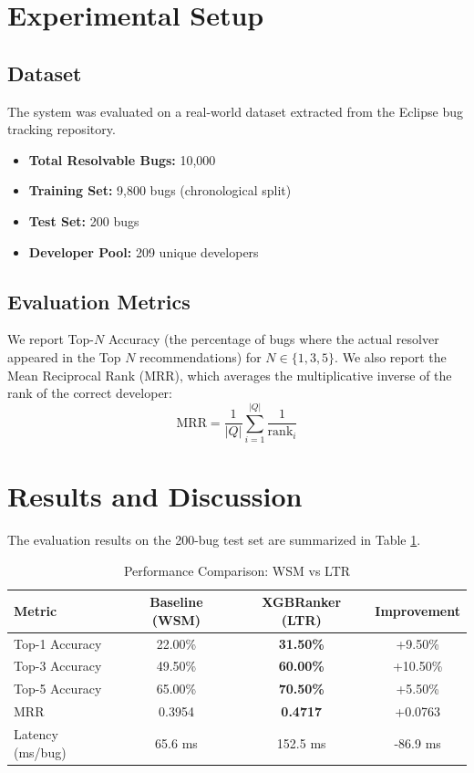 \documentclass[conference]{IEEEtran}
\begin{document}
\section{Experimental Setup}

\subsection{Dataset}
The system was evaluated on a real-world dataset extracted from the Eclipse bug tracking repository. 
\begin{itemize}
    \item \textbf{Total Resolvable Bugs:} 10,000
    \item \textbf{Training Set:} 9,800 bugs (chronological split)
    \item \textbf{Test Set:} 200 bugs
    \item \textbf{Developer Pool:} 209 unique developers
\end{itemize}

\subsection{Evaluation Metrics}
We report Top-$N$ Accuracy (the percentage of bugs where the actual resolver appeared in the Top $N$ recommendations) for $N \in \{1, 3, 5\}$. We also report the Mean Reciprocal Rank (MRR), which averages the multiplicative inverse of the rank of the correct developer:
\begin{equation}
\text{MRR} = \frac{1}{|Q|} \sum_{i=1}^{|Q|} \frac{1}{\text{rank}_i}
\end{equation}

\section{Results and Discussion}

The evaluation results on the 200-bug test set are summarized in Table \ref{tab:results}.

\begin{table}[htbp]
\centering
\caption{Performance Comparison: WSM vs LTR}
\label{tab:results}
\begin{tabular}{@{}lccc@{}}
\toprule
\textbf{Metric} & \textbf{Baseline (WSM)} & \textbf{XGBRanker (LTR)} & \textbf{Improvement} \\ \midrule
Top-1 Accuracy & 22.00\% & \textbf{31.50\%} & +9.50\% \\
Top-3 Accuracy & 49.50\% & \textbf{60.00\%} & +10.50\% \\
Top-5 Accuracy & 65.00\% & \textbf{70.50\%} & +5.50\% \\
MRR & 0.3954 & \textbf{0.4717} & +0.0763 \\
Latency (ms/bug)& 65.6 ms & 152.5 ms & -86.9 ms \\ \bottomrule
\end{tabular}
\end{table}
\end{document}
